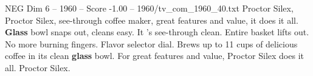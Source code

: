 \begin{textsample}{NEG Dim 6 – 1960 – Score -1.00 – 1960/tv\_com\_1960\_40.txt}  \label{ex:f6_neg_079}
Proctor Silex, Proctor Silex, see-through coffee maker, great features and value, it does it all. \textbf{Glass} bowl snaps out, cleans easy.
It 's see-through clean.
Entire basket lifts out.
No more burning fingers.
Flavor selector dial.
Brews up to 11 cups of delicious coffee in its clean \textbf{glass} bowl.
For great features and value, Proctor Silex does it all.
Proctor Silex.

\end{textsample}
